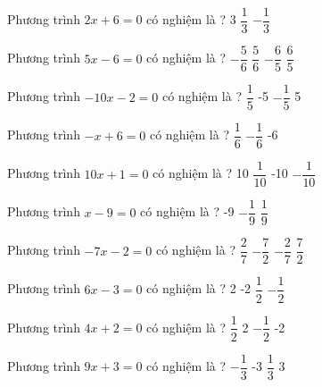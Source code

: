 \begin{ex} 
	Phương trình $2x+6=0$ có nghiệm là ? 
	\choice
	{3}
	{$ \dfrac{ 1 }{ 3 } $}
	{$- \dfrac{ 1 }{ 3 } $}
	{}
	\loigiai{} 
\end{ex}

\begin{ex} 
	Phương trình $5x-6=0$ có nghiệm là ? 
	\choice
	{$- \dfrac{ 5 }{ 6 } $}
	{$ \dfrac{ 5 }{ 6 } $}
	{$- \dfrac{ 6 }{ 5 } $}
	{\True $ \dfrac{ 6 }{ 5 } $}
	\loigiai{} 
\end{ex}

\begin{ex} 
	Phương trình $-10x-2=0$ có nghiệm là ? 
	\choice
	{$ \dfrac{ 1 }{ 5 } $}
	{-5}
	{\True $- \dfrac{ 1 }{ 5 } $}
	{5}
	\loigiai{} 
\end{ex}

\begin{ex} 
	Phương trình $-x+6=0$ có nghiệm là ? 
	\choice
	{$ \dfrac{ 1 }{ 6 } $}
	{$- \dfrac{ 1 }{ 6 } $}
	{-6}
	{}
	\loigiai{} 
\end{ex}

\begin{ex} 
	Phương trình $10x+1=0$ có nghiệm là ? 
	\choice
	{10}
	{$ \dfrac{ 1 }{ 10 } $}
	{-10}
	{\True $- \dfrac{ 1 }{ 10 } $}
	\loigiai{} 
\end{ex}

\begin{ex} 
	Phương trình $x-9=0$ có nghiệm là ? 
	\choice
	{-9}
	{$- \dfrac{ 1 }{ 9 } $}
	{}
	{$ \dfrac{ 1 }{ 9 } $}
	\loigiai{} 
\end{ex}

\begin{ex} 
	Phương trình $-7x-2=0$ có nghiệm là ? 
	\choice
	{$ \dfrac{ 2 }{ 7 } $}
	{$- \dfrac{ 7 }{ 2 } $}
	{\True $- \dfrac{ 2 }{ 7 } $}
	{$ \dfrac{ 7 }{ 2 } $}
	\loigiai{} 
\end{ex}

\begin{ex} 
	Phương trình $6x-3=0$ có nghiệm là ? 
	\choice
	{2}
	{-2}
	{\True $ \dfrac{ 1 }{ 2 } $}
	{$- \dfrac{ 1 }{ 2 } $}
	\loigiai{} 
\end{ex}

\begin{ex} 
	Phương trình $4x+2=0$ có nghiệm là ? 
	\choice
	{$ \dfrac{ 1 }{ 2 } $}
	{2}
	{\True $- \dfrac{ 1 }{ 2 } $}
	{-2}
	\loigiai{} 
\end{ex}

\begin{ex} 
	Phương trình $9x+3=0$ có nghiệm là ? 
	\choice
	{\True $- \dfrac{ 1 }{ 3 } $}
	{-3}
	{$ \dfrac{ 1 }{ 3 } $}
	{3}
	\loigiai{} 
\end{ex}

